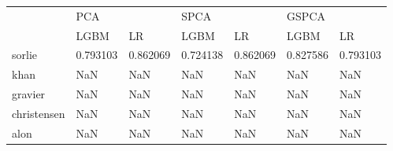\begin{tabular}{lllllll}
\toprule
{} & \multicolumn{2}{l}{PCA} & \multicolumn{2}{l}{SPCA} & \multicolumn{2}{l}{GSPCA} \\
{} &      LGBM &        LR &      LGBM &        LR &      LGBM &        LR \\
\midrule
sorlie      &  0.793103 &  0.862069 &  0.724138 &  0.862069 &  0.827586 &  0.793103 \\
khan        &       NaN &       NaN &       NaN &       NaN &       NaN &       NaN \\
gravier     &       NaN &       NaN &       NaN &       NaN &       NaN &       NaN \\
christensen &       NaN &       NaN &       NaN &       NaN &       NaN &       NaN \\
alon        &       NaN &       NaN &       NaN &       NaN &       NaN &       NaN \\
\bottomrule
\end{tabular}
